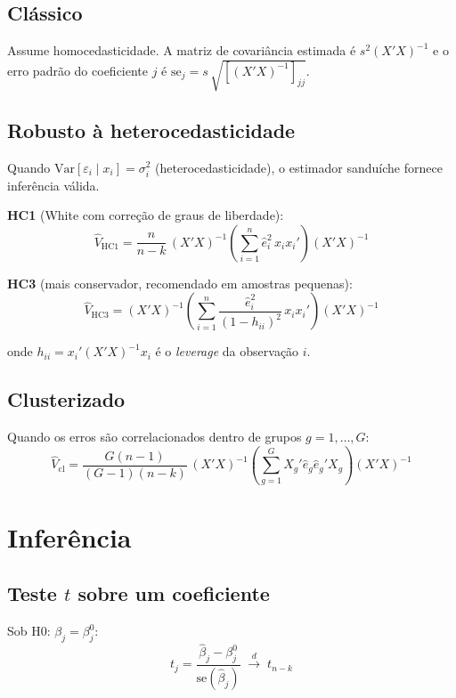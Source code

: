 \subsection*{Clássico}

Assume homocedasticidade. A matriz de covariância estimada é
$s^2(X'X)^{-1}$ e o erro padrão do coeficiente $j$ é
$\mathrm{se}_j = s\,\sqrt{[(X'X)^{-1}]_{jj}}$.

\subsection*{Robusto à heterocedasticidade}

Quando $\mathrm{Var}[\varepsilon_i \mid x_i] = \sigma_i^2$ (heterocedasticidade),
o estimador sanduíche fornece inferência válida.

\textbf{HC1} (White com correção de graus de liberdade):
\[
  \hat{V}_{\mathrm{HC1}} = \frac{n}{n-k}\,(X'X)^{-1}
    \!\left(\sum_{i=1}^{n} \hat{e}_i^2\, x_i x_i'\right)\!(X'X)^{-1}
\]

\textbf{HC3} (mais conservador, recomendado em amostras pequenas):
\[
  \hat{V}_{\mathrm{HC3}} = (X'X)^{-1}
    \!\left(\sum_{i=1}^{n} \frac{\hat{e}_i^2}{(1 - h_{ii})^2}\, x_i x_i'\right)\!(X'X)^{-1}
\]

onde $h_{ii} = x_i'(X'X)^{-1}x_i$ é o \emph{leverage} da observação $i$.

\subsection*{Clusterizado}

Quando os erros são correlacionados dentro de grupos $g = 1,\ldots,G$:
\[
  \hat{V}_{\mathrm{cl}} = \frac{G(n-1)}{(G-1)(n-k)}\,
    (X'X)^{-1}\!\left(\sum_{g=1}^{G} X_g'\hat{e}_g\hat{e}_g'X_g\right)\!(X'X)^{-1}
\]

\section{Inferência}

\subsection*{Teste $t$ sobre um coeficiente}

Sob H0: $\beta_j = \beta_j^0$:
\[
  t_j = \frac{\hat{\beta}_j - \beta_j^0}{\mathrm{se}(\hat{\beta}_j)}
  \;\xrightarrow{d}\; t_{n-k}
\]

